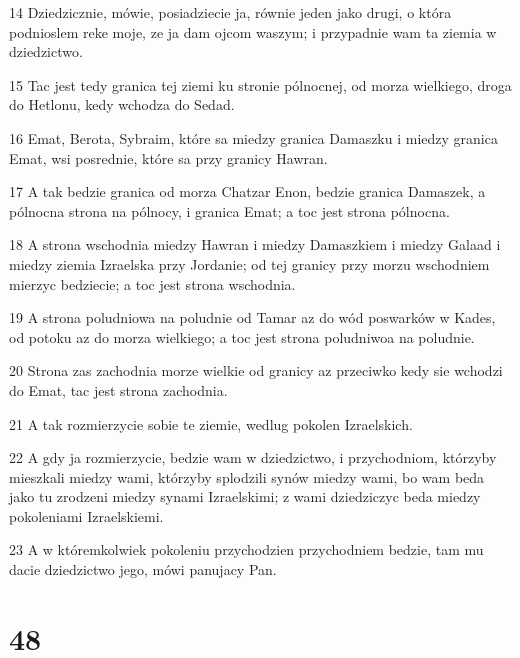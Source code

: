 \par 14 Dziedzicznie, mówie, posiadziecie ja, równie jeden jako drugi, o która podnioslem reke moje, ze ja dam ojcom waszym; i przypadnie wam ta ziemia w dziedzictwo.
\par 15 Tac jest tedy granica tej ziemi ku stronie pólnocnej, od morza wielkiego, droga do Hetlonu, kedy wchodza do Sedad.
\par 16 Emat, Berota, Sybraim, które sa miedzy granica Damaszku i miedzy granica Emat, wsi posrednie, które sa przy granicy Hawran.
\par 17 A tak bedzie granica od morza Chatzar Enon, bedzie granica Damaszek, a pólnocna strona na pólnocy, i granica Emat; a toc jest strona pólnocna.
\par 18 A strona wschodnia miedzy Hawran i miedzy Damaszkiem i miedzy Galaad i miedzy ziemia Izraelska przy Jordanie; od tej granicy przy morzu wschodniem mierzyc bedziecie; a toc jest strona wschodnia.
\par 19 A strona poludniowa na poludnie od Tamar az do wód poswarków w Kades, od potoku az do morza wielkiego; a toc jest strona poludniwoa na poludnie.
\par 20 Strona zas zachodnia morze wielkie od granicy az przeciwko kedy sie wchodzi do Emat, tac jest strona zachodnia.
\par 21 A tak rozmierzycie sobie te ziemie, wedlug pokolen Izraelskich.
\par 22 A gdy ja rozmierzycie, bedzie wam w dziedzictwo, i przychodniom, którzyby mieszkali miedzy wami, którzyby splodzili synów miedzy wami, bo wam beda jako tu zrodzeni miedzy synami Izraelskimi; z wami dziedziczyc beda miedzy pokoleniami Izraelskiemi.
\par 23 A w któremkolwiek pokoleniu przychodzien przychodniem bedzie, tam mu dacie dziedzictwo jego, mówi panujacy Pan.

\chapter{48}

